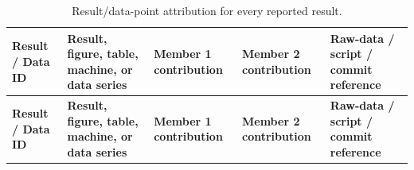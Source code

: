 \documentclass{article}
\begin{document}
\begin{longtable}{|p{1.2cm}|p{4cm}|p{2.5cm}|p{2.5cm}|p{3cm}|}
\caption{Result/data-point attribution for every reported result.}
\label{tab:result-attribution} \\

\hline
\textbf{Result / Data ID} &
\textbf{Result, figure, table, machine, or data series} &
\textbf{Member 1 contribution} &
\textbf{Member 2 contribution} &
\textbf{Raw-data / script / commit reference} \\
\hline
\endfirsthead

\hline
\textbf{Result / Data ID} &
\textbf{Result, figure, table, machine, or data series} &
\textbf{Member 1 contribution} &
\textbf{Member 2 contribution} &
\textbf{Raw-data / script / commit reference} \\
\hline
\endhead


\end{longtable}
\end{document}
